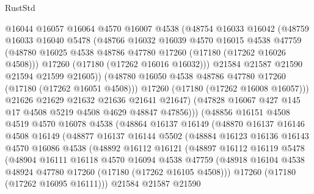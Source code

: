\begin{lexlean}{RustStd}
\begin{coremodule}
                  @16044
                  @16057
                  @16064
                  @4570
                  @16007
                  @4538
                  (@48754
                    @16033
                    @16042
                    (@48759
                      @16033
                      @16040
                      @5478
                      (@48766
                        @16032
                        @16039
                        @4570
                        @16015
                        @4538
                        @47759
                        (@48780 @16025 @4538 @48786 @47780 @17260 (@17180 (@17262 @16026 @4508)))
                        @17260
                        (@17180 (@17262 @16016 @16032)))
                      @21584
                      @21587
                      @21590
                      @21594
                      @21599
                      @21605))
                  (@48780 @16050 @4538 @48786 @47780 @17260 (@17180 (@17262 @16051 @4508)))
                  @17260
                  (@17180 (@17262 @16008 @16057)))
                @21626
                @21629
                @21632
                @21636
                @21641
                @21647)
              (@47828 @16067 @427 @145 @17 @4508 @5219 @4508 @4629 @48847 @47856)))
          (@48856
            @16151
            @4508
            @4519
            @4570
            @16078
            @4538
            (@48864
              @16137
              @16149
              (@48870
                @16137
                @16146
                @4508
                @16149
                (@48877
                  @16137
                  @16144
                  @5502
                  (@48884
                    @16123
                    @16136
                    @16143
                    @4570
                    @16086
                    @4538
                    (@48892
                      @16112
                      @16121
                      (@48897
                        @16112
                        @16119
                        @5478
                        (@48904
                          @16111
                          @16118
                          @4570
                          @16094
                          @4538
                          @47759
                          (@48918 @16104 @4538 @48924 @47780 @17260 (@17180 (@17262 @16105 @4508)))
                          @17260
                          (@17180 (@17262 @16095 @16111)))
                        @21584
                        @21587
                        @21590

\end{coremodule}
\end{lexlean}
